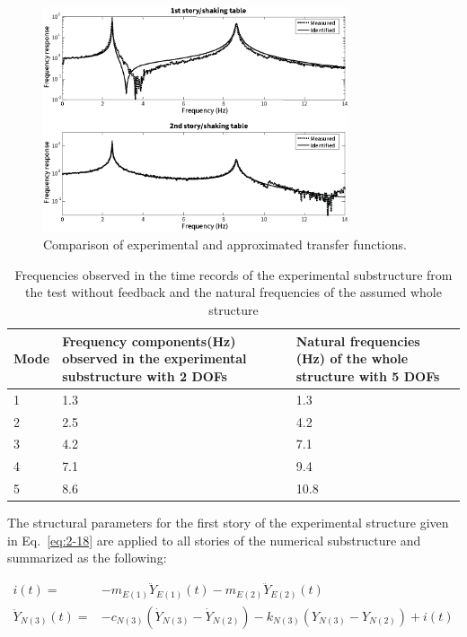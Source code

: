 \begin{figure}[ht]
\centering
\includegraphics[width=0.8\textwidth] {figure/2-10.eps}
\caption{Comparison of experimental and approximated transfer functions.}
\label{fig:2-10}
\end{figure}

\begin{table}[ht]
\centering
\begin{tabularx}{\textwidth}{@{}X|X|X@{}}
\toprule[1pt]\midrule[0.3pt]
Mode&Frequency components(Hz) observed in the experimental substructure with 2 DOFs&Natural frequencies (Hz) of the whole structure with 5 DOFs\\ \hline
1&1.3&1.3\\
2&2.5&4.2\\
3&4.2&7.1\\
4&7.1&9.4\\
5&8.6&10.8\\ \bottomrule
\end{tabularx}
\caption{Frequencies observed in the time records of the experimental substructure from the test without feedback and the natural frequencies of the assumed whole structure}
\label{tab:2-1}
\end{table}

The structural parameters for the first story of the experimental structure given in Eq.~\eqref{eq:2-18} are applied to all stories of the numerical substructure and summarized as the following:

\begin{align}
i(t)=&-m_{E(1)}\ddot{Y}_{E(1)}(t)-m_{E(2)}\ddot{Y}_{E(2)}(t) \label{eq:2-19} \\
\ddot{Y}_{N(3)}(t)=&-c_{N(3)}\left(\dot{Y}_{N(3)}-\dot{Y}_{N(2)}\right) -k_{N(3)}\left(Y_{N(3)}-Y_{N(2)}\right)+i(t) \label{eq:2-20}
\end{align}

